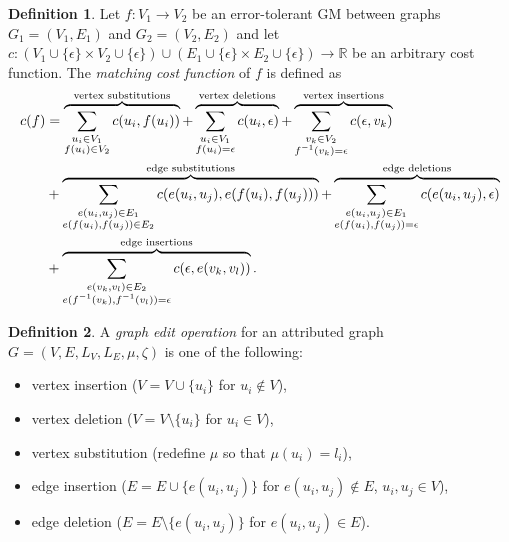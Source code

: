 \documentclass{article}
\theoremstyle{definition}
\newtheorem{definition}{Definition}[section]
\begin{document}
\begin{definition}
  Let $f: V_1 \to V_2$ be an error-tolerant GM between graphs $G_1 = (V_1, E_1)$ and $G_2 = (V_2, E_2)$ and let $c: (V_1 \cup \{ \epsilon \} \times V_2 \cup \{ \epsilon \}) \cup (E_1 \cup \{ \epsilon \} \times E_2 \cup \{ \epsilon \}) \to \mathbb{R}$ be an arbitrary cost function. The \emph{matching cost function} of $f$ is defined as
  \[
  \begin{aligned}
    c(f) &= \overbrace{\sum_{\substack{u_i \in V_1\\ f(u_i) \in V_2}} c(u_i, f(u_i))}^{\mathclap{\text{vertex substitutions}}} + \overbrace{\sum_{\substack{u_i \in V_1\\ f(u_i) = \epsilon}} c(u_i, \epsilon)}^{\mathclap{\text{vertex deletions}}} + \overbrace{\sum_{\substack{v_k \in V_2\\ f^{-1}(v_k) = \epsilon}} c(\epsilon, v_k)}^{\mathclap{\text{vertex insertions}}} \\
    &+ \overbrace{\sum_{\substack{e(u_i, u_j) \in E_1\\ e(f(u_i), f(u_j)) \in E_2}} c(e(u_i, u_j), e(f(u_i), f(u_j)))}^{\mathclap{\text{edge substitutions}}} + \overbrace{\sum_{\substack{e(u_i, u_j) \in E_1\\ e(f(u_i), f(u_j)) = \epsilon}} c(e(u_i, u_j), \epsilon)}^{\mathclap{\text{edge deletions}}} \\
    &+ \overbrace{\sum_{\substack{e(v_k, v_l) \in E_2\\ e(f^{-1}(v_k), f^{-1}(v_l)) = \epsilon}} c(\epsilon, e(v_k, v_l))}^{\mathclap{\text{edge insertions}}}.
  \end{aligned}
  \]
\end{definition}
\begin{definition}
  A \emph{graph edit operation} for an attributed graph $G = (V, E, L_V, L_E, \mu, \zeta)$ is one of the following:
  \begin{itemize}
  \item vertex insertion ($V = V \cup \{ u_i \}$ for $u_i \not \in V$),
  \item vertex deletion ($V = V \setminus \{ u_i \}$ for $u_i \in V$),
  \item vertex substitution (redefine $\mu$ so that $\mu(u_i) = l_i$),
  \item edge insertion ($E = E \cup \{ e(u_i, u_j) \}$ for $e(u_i, u_j) \not \in E$, $u_i, u_j \in V$),
  \item edge deletion ($E = E \setminus \{ e(u_i, u_j) \}$ for $e(u_i, u_j) \in E$).
  \end{itemize}
\end{definition}
\end{document}
